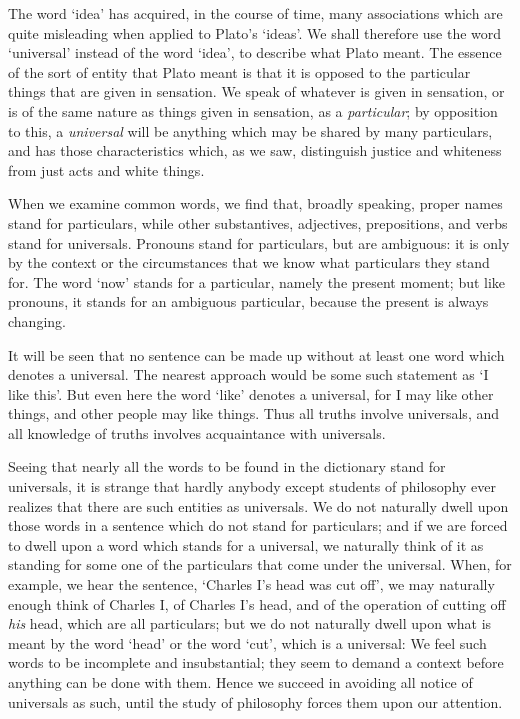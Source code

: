 \documentclass[oneside,letterpaper,12pt]{book}
\begin{document}
The word `idea' has acquired, in the
course of time, many associations which are quite misleading when
applied to Plato's
`ideas'. We shall therefore use the word
`universal' instead of the word
`idea', to describe what Plato meant. The
essence of the sort of entity that Plato meant is that it is opposed to
the particular things that are given in sensation. We speak of whatever
is given in sensation, or is of the same nature as things given in
sensation, as a \emph{particular}; by opposition to this, a
\emph{universal} will be anything which may be shared by many
particulars, and has those characteristics which, as we saw, distinguish
justice and whiteness from just acts and white things.

When we examine common words, we find that, broadly speaking, proper
names stand for particulars, while other substantives, adjectives,
prepositions, and verbs stand for universals. Pronouns stand for
particulars, but are ambiguous: it is only by the context or the
circumstances that we know what particulars they stand for. The word
`now' stands for a particular, namely
the present moment; but like pronouns, it stands for an ambiguous
particular, because the present is always changing.

It will be seen that no sentence can be made up without at least one
word which denotes a universal. The nearest approach would be some such
statement as `I like this'. But even here
the word `like' denotes a universal,
for I may like other things, and other people may like things. Thus all
truths involve universals, and all knowledge of truths involves
acquaintance with universals.

Seeing that nearly all the words to be found in the dictionary stand for
universals, it is strange that hardly anybody except students of
philosophy ever realizes that there are such entities as universals. We
do not naturally dwell upon those words in a sentence which do not stand
for particulars; and if we are forced to dwell upon a word which stands
for a universal, we naturally think of it as standing for some one of
the particulars that come under the universal. When, for example, we
hear the sentence, `Charles I's head was
cut off', we may naturally enough think of Charles I, of
Charles I's head, and of the operation of cutting off
\emph{his} head, which are all particulars; but we do not naturally
dwell upon what is meant by the word
`head' or the word
`cut', which is a universal: We feel such
words to be incomplete and insubstantial; they seem to demand a context
before anything can be done with them. Hence we succeed in avoiding all
notice of universals as such, until the study of philosophy forces them
upon our attention.
\end{document}
